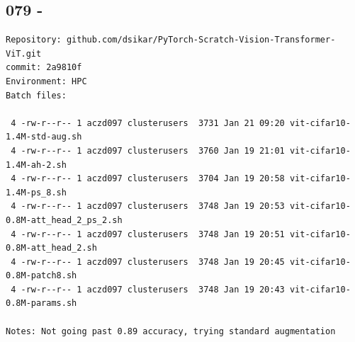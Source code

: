 \subsection{079 - }
\label{app_res:079}
\begin{verbatim}
Repository: github.com/dsikar/PyTorch-Scratch-Vision-Transformer-ViT.git
commit: 2a9810f
Environment: HPC 
Batch files:

 4 -rw-r--r-- 1 aczd097 clusterusers  3731 Jan 21 09:20 vit-cifar10-1.4M-std-aug.sh
 4 -rw-r--r-- 1 aczd097 clusterusers  3760 Jan 19 21:01 vit-cifar10-1.4M-ah-2.sh
 4 -rw-r--r-- 1 aczd097 clusterusers  3704 Jan 19 20:58 vit-cifar10-1.4M-ps_8.sh
 4 -rw-r--r-- 1 aczd097 clusterusers  3748 Jan 19 20:53 vit-cifar10-0.8M-att_head_2_ps_2.sh
 4 -rw-r--r-- 1 aczd097 clusterusers  3748 Jan 19 20:51 vit-cifar10-0.8M-att_head_2.sh
 4 -rw-r--r-- 1 aczd097 clusterusers  3748 Jan 19 20:45 vit-cifar10-0.8M-patch8.sh
 4 -rw-r--r-- 1 aczd097 clusterusers  3748 Jan 19 20:43 vit-cifar10-0.8M-params.sh
 
Notes: Not going past 0.89 accuracy, trying standard augmentation


\end{verbatim}
